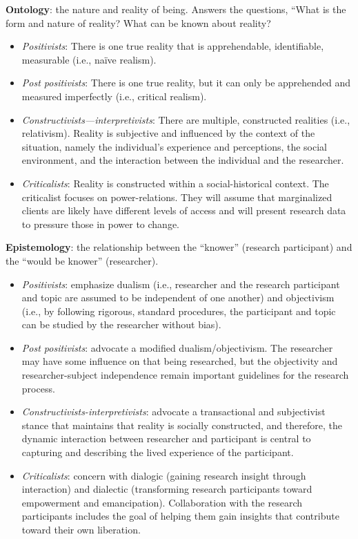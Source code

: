 \documentclass[
  english,
]{book}
\providecommand{\tightlist}{%
  \setlength{\itemsep}{0pt}\setlength{\parskip}{0pt}}
\begin{document}
\textbf{Ontology}: the nature and reality of being. Answers the questions, ``What is the form and nature of reality? What can be known about reality?

\begin{itemize}
\tightlist
\item
  \emph{Positivists}: There is one true reality that is apprehendable, identifiable, measurable (i.e., naïve realism).
\item
  \emph{Post positivists}: There is one true reality, but it can only be apprehended and measured imperfectly (i.e., critical realism).
\item
  \emph{Constructivists---interpretivists}: There are multiple, constructed realities (i.e., relativism). Reality is subjective and influenced by the context of the situation, namely the individual's experience and perceptions, the social environment, and the interaction between the individual and the researcher.
\item
  \emph{Criticalists}: Reality is constructed within a social-historical context. The criticalist focuses on power-relations. They will assume that marginalized clients are likely have different levels of access and will present research data to pressure those in power to change.
\end{itemize}

\textbf{Epistemology}: the relationship between the ``knower'' (research participant) and the ``would be knower'' (researcher).

\begin{itemize}
\tightlist
\item
  \emph{Positivists}: emphasize dualism (i.e., researcher and the research participant and topic are assumed to be independent of one another) and objectivism (i.e., by following rigorous, standard procedures, the participant and topic can be studied by the researcher without bias).
\item
  \emph{Post positivists}: advocate a modified dualism/objectivism. The researcher may have some influence on that being researched, but the objectivity and researcher-subject independence remain important guidelines for the research process.
\item
  \emph{Constructivists-interpretivists}: advocate a transactional and subjectivist stance that maintains that reality is socially constructed, and therefore, the dynamic interaction between researcher and participant is central to capturing and describing the lived experience of the participant.
\item
  \emph{Criticalists}: concern with dialogic (gaining research insight through interaction) and dialectic (transforming research participants toward empowerment and emancipation). Collaboration with the research participants includes the goal of helping them gain insights that contribute toward their own liberation.
\end{itemize}
\end{document}
